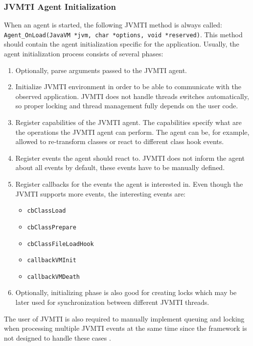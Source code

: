 \subsubsection{JVMTI Agent Initialization}
\label{subsec:jvmti_init}
When an agent is started, the following JVMTI method is always called: \newline \texttt{Agent\_OnLoad(JavaVM *jvm, char *options, void *reserved)}. \newline This method should contain the agent initialization specific for the application. Usually, the agent initialization process consists of several phases:
\begin{enumerate}
	\item Optionally, parse arguments passed to the JVMTI agent.
	\item Initialize JVMTI environment in order to be able to communicate with the observed application. JVMTI does not handle threads switches automatically, so proper locking and thread management fully depends on the user code.
	\item Register capabilities of the JVMTI agent. The capabilities specify what are the operations the JVMTI agent can perform. The agent can be, for example, allowed to re-transform classes or react to different class hook events.
	\item Register events the agent should react to. JVMTI does not inform the agent about all events by default, these events have to be manually defined.
	\item Register callbacks for the events the agent is interested in. Even though the JVMTI supports more events, the interesting events are: 
		\begin{itemize}
			\item \texttt{cbClassLoad}
			\item \texttt{cbClassPrepare}
			\item \texttt{cbClassFileLoadHook}
			\item \texttt{callbackVMInit}
			\item \texttt{callbackVMDeath}
		\end{itemize}
	\item Optionally, initializing phase is also good for creating locks which may be later used for synchronization between different JVMTI threads.
\end{enumerate}

The user of JVMTI is also required to manually implement queuing and locking when processing multiple JVMTI events at the same time since the framework is not designed to handle these cases \cite{JVMTI_Callbacks}.
